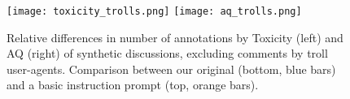 \begin{figure}[t]
    \centering
    \texttt{[image: toxicity\_trolls.png]} \hfill
    \texttt{[image: aq\_trolls.png]}
    \caption{Relative differences in number of annotations by Toxicity (left) and \ac{AQ} (right) of synthetic discussions, excluding comments by troll user-agents. Comparison between our original (bottom, blue bars) and a basic instruction prompt (top, orange bars).}
    \label{fig::boxplots}
\end{figure}

